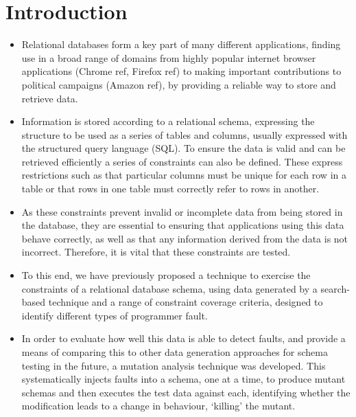 
\section{Introduction}
\label{sec:introduction}

\begin{itemize}

  \item Relational databases form a key part of many different applications, finding use in a broad range of domains from highly popular internet browser applications (Chrome ref, Firefox ref) to making important contributions to political campaigns (Amazon ref), by providing a reliable way to store and retrieve data.

  \item Information is stored according to a relational schema, expressing the structure to be used as a series of tables and columns, usually expressed with the structured query language (SQL). To ensure the data is valid and can be retrieved efficiently a series of constraints can also be defined. These express restrictions such as that particular columns must be unique for each row in a table or that rows in one table must correctly refer to rows in another.

  \item As these constraints prevent invalid or incomplete data from being stored in the database, they are essential to ensuring that applications using this data behave correctly, as well as that any information derived from the data is not incorrect. Therefore, it is vital that these constraints are tested.

  \item To this end, we have previously proposed a technique to exercise the constraints of a relational database schema, using data generated by a search-based technique and a range of constraint coverage criteria, designed to identify different types of programmer fault.

  \item In order to evaluate how well this data is able to detect faults, and provide a means of comparing this to other data generation approaches for schema testing in the future, a mutation analysis technique was developed. This systematically injects faults into a schema, one at a time, to produce mutant schemas and then executes the test data against each, identifying whether the modification leads to a change in behaviour, `killing' the mutant.


\end{itemize}
